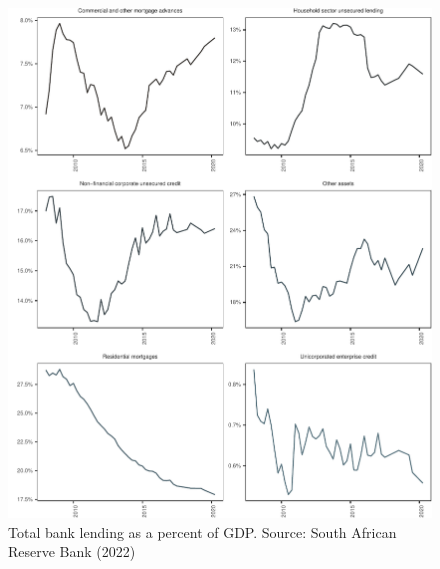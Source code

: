 \documentclass[
]{article}
\begin{document}
\begin{figure}[H]

\includegraphics{Bank_capital_and_bank_lending_files/figure-latex/ba900gdptotals-1} \hfill{}

\caption{Total bank lending as a percent of GDP. Source: South African Reserve Bank (2022)}\label{fig:ba900gdptotals}
\end{figure}
\end{document}
